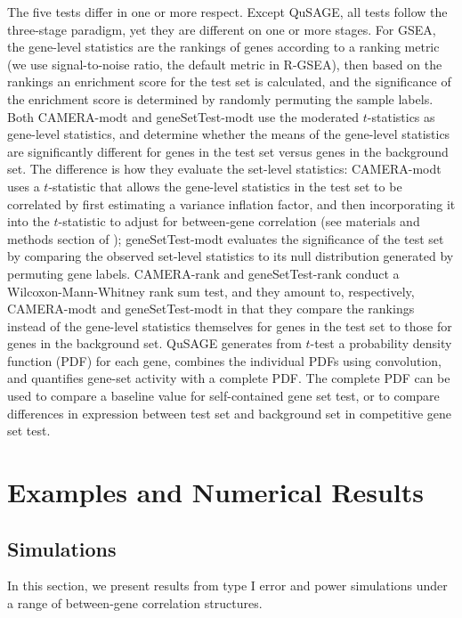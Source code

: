 \documentclass[11pt, a4paper]{article}
\begin{document}
	The five tests differ in one or more respect. Except QuSAGE, all tests follow the three-stage paradigm, yet they are different on one or more stages. For GSEA, the gene-level statistics are the rankings of genes according to a ranking metric (we use signal-to-noise ratio, the default metric in R-GSEA), then based on the rankings an enrichment score for the test set is calculated, and the significance of the enrichment score is determined by randomly permuting the sample labels. Both CAMERA-modt and geneSetTest-modt use the moderated $t$-statistics \citep{Smyth2004moderated} as gene-level statistics, and determine whether the means of the gene-level statistics are significantly different for genes in the test set versus genes in the background set. The difference is how they evaluate the set-level statistics: CAMERA-modt uses a $t$-statistic that allows the gene-level statistics in the test set to be correlated by first estimating a variance inflation factor, and then incorporating it into the $t$-statistic to adjust for between-gene correlation (see materials and methods section of \cite{wu2012camera}); geneSetTest-modt evaluates the significance of the test set by comparing the observed set-level statistics to its null distribution generated by permuting gene labels. CAMERA-rank and geneSetTest-rank conduct a Wilcoxon-Mann-Whitney rank sum test, and they amount to, respectively,  CAMERA-modt and geneSetTest-modt in that they compare the rankings instead of the gene-level statistics themselves for genes in the test set to those for genes in the background set. QuSAGE generates from $t$-test a probability density function (PDF) for each gene, combines the individual PDFs using convolution, and quantifies gene-set activity with a complete PDF. The complete PDF can be used to compare a baseline value for self-contained gene set test, or to compare differences in expression between test set and background set in competitive gene set test.  
	

	
	\section{Examples and Numerical Results}\label{section:results}

	\subsection{Simulations}\label{subsection:simulation}
		In this section, we present results from type I error and power simulations under a range of between-gene correlation structures.
		
\end{document}
